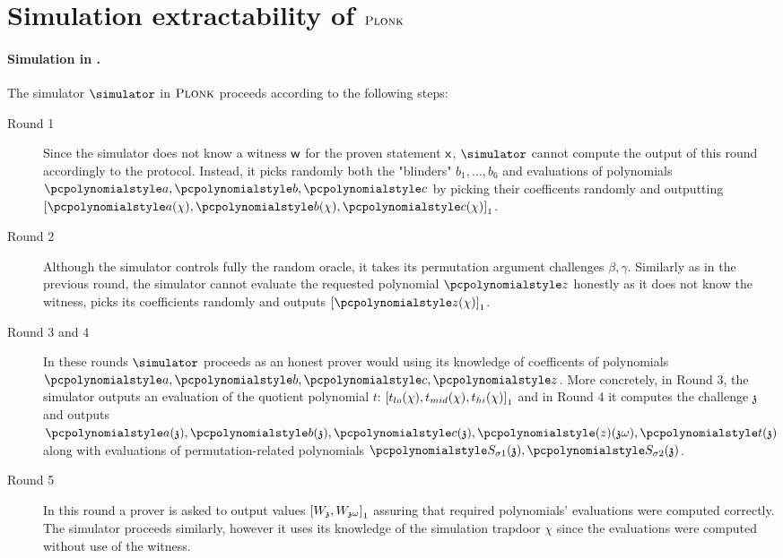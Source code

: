 \documentclass[runningheads,11pt]{llncs}
\theoremstyle{definition}
\begin{document}
\section{Simulation extractability of $\textsc{Plonk}$}
\newcommand{\chz}{\mathfrak{z}}
\paragraph{Simulation in \plonk.}
The simulator $\simulator$ in $\textsc{Plonk}$ proceeds according to the following steps:
\begin{description}
	\item[Round 1]
	Since the simulator does not know a witness $\mathsf{w}$ for the proven statement $\mathsf{x}$, $\simulator$ cannot compute the output of this round accordingly to the protocol. Instead, it picks randomly both the "blinders" $b_1, \ldots, b_6$ and evaluations of polynomials $\p{a}, \p{b}, \p{c}$ by picking their coefficents randomly and outputting $\gone{\p{a}(\chi), \p{b}(\chi), \p{c}(\chi)}$.
	\item[Round 2]
	Although the simulator controls fully the random oracle, it takes its permutation argument challenges $\beta, \gamma$.
	Similarly as in the previous round, the simulator cannot evaluate the requested polynomial $\p{z}$ honestly as it does not know the witness, picks its coefficients randomly and outputs $\gone{\p{z}(\chi)}$.
	\item[Round 3 and 4]
	In these rounds $\simulator$ proceeds as an honest prover would using its knowledge of coefficents of polynomials $\p{a}, \p{b}, \p{c}, \p{z}$.
	More concretely, in Round 3, the simulator outputs an evaluation of the quotient polynomial $t$: $\left[t_{lo}(\chi), t_{mid}(\chi), t_{hi}(\chi)\right]_{1}$ and in
	Round 4 it computes the challenge $\chz$ and outputs $\p{a}(\chz), \p{b}(\chz), \p{c}(\chz), \p(z)(\chz \omega), \p{t}(\chz)$ along with evaluations of permutation-related polynomials $\p{S_{\sigma 1}(\chz)}, \p{S_{\sigma 2}(\chz)}$.
	\item[Round 5]
	In this round a prover is asked to output values $\gone{W_{\chz}, W_{\chz \omega}}$ assuring that required polynomials' evaluations were computed correctly. The simulator proceeds similarly, however it uses its knowledge of the simulation trapdoor $\chi$ since the evaluations were computed without use of the witness.
\end{description}



\end{document}
